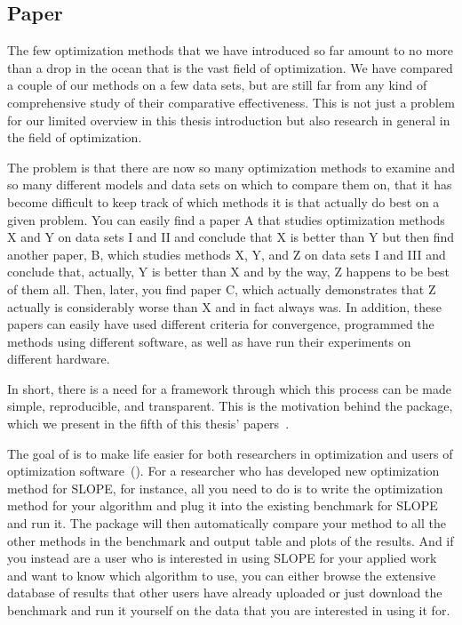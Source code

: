 \subsection{Paper \IV}

The few optimization methods that we have introduced so far amount to no more than a drop in the ocean that is the vast field of optimization. We have compared a couple of our methods on a few data sets, but are still far from any kind of comprehensive study of their comparative effectiveness. This is not just a problem for our limited overview in this thesis introduction but also research in general in the field of optimization.

The problem is that there are now so many optimization methods to examine and so many different models and data sets on which to compare them on, that it has become difficult to keep track of which methods it is that actually do best on a given problem. You can easily find a paper A that studies optimization methods X and Y on data sets I and II and conclude that X is better than Y but then find another paper, B, which studies methods X, Y, and Z on data sets I and III and conclude that, actually, Y is better than X and by the way, Z happens to be best of them all. Then, later, you find paper C, which actually demonstrates that Z actually is considerably worse than X and in fact always was. In addition, these papers can easily have used different criteria for convergence, programmed the methods using different software, as well as have run their experiments on different hardware.

In short, there is a need for a framework through which this process can be made simple, reproducible, and transparent. This is the motivation behind the  package, which we present in the fifth of this thesis' papers~\parencite{moreau2022a}.

The goal of  is to make life easier for both researchers in optimization and users of optimization software~(). For a researcher who has developed new optimization method for SLOPE, for instance, all you need to do is to write the optimization method for your algorithm and plug it into the existing  benchmark for SLOPE and run it. The package will then automatically compare your method to all the other methods in the benchmark and output table and plots of the results. And if you instead are a user who is interested in using SLOPE for your applied work and want to know which algorithm to use, you can either browse the extensive database of results that other users have already uploaded or just download the benchmark and run it yourself on the data that you are interested in using it for.

